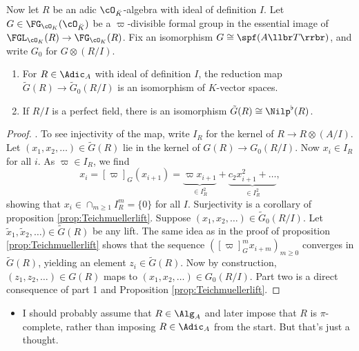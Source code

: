 \documentclass[../main.tex]{subfiles}
\begin{document}
\begin{prop}\label{prop:UnivCovRep}
    Now let $R$ be an adic $\cO_{\breve K}$-algebra with
    ideal of definition $I$. Let $G \in \FG_{\cO_K}(\cO_{\breve K})$ be a 
    $\varpi$-divisible formal group in the essential image of 
    $\FGL_{\cO_K}(R) \to \FG_{\cO_K}(R)$. Fix an isomorphism $G \cong
    \spf(A\llbr T \rrbr)$, and write $G_0$ for $G \otimes (R/I)$. 
    \begin{enumerate}
        \item For $R \in \Adic_A$ with ideal of definition $I$, the reduction
            map $\tilde G(R) \to \tilde G_0(R/I)$ is an isomorphism of 
            $K$-vector spaces.
        \item If $R/I$ is a perfect field, there is an isomorphism $\tilde G(R)
            \cong \Nilp^\flat(R)$.
    \end{enumerate}
\begin{proof}
    .
    To see injectivity of the map, write $I_R$ for the kernel of $R \to R \otimes
    (A/I)$. Let $(x_1, x_2, \dots) \in \tilde G(R)$ lie in the kernel of $G(R)
    \to G_0(R/I)$. Now $x_i \in I_R$ for all $i$. As $\varpi \in I_R$, we find 
    $$x_{i} = [\varpi]_G(x_{i+1}) = \underbrace{\varpi x_{i+1}}_{\in I_R^2} +
    \underbrace{c_2 x_{i+1}^2 + \dots}_{\in I_R^2},$$
    showing that $x_i \in \cap_{m\geq 1} I_R^m = \{0\}$ for all $I$.
    Surjectivity is a corollary of proposition \ref{prop:Teichmuellerlift}. 
    Suppose $(x_1, x_2, \dots) \in \tilde G_0(R/I)$. Let
    $\tilde x_1, \tilde x_2, \dots) \in \tilde G(R)$ be any lift. The same idea
    as in the proof of proposition \ref{prop:Teichmuellerlift} shows that the
    sequence $([\varpi]_G^{m} x_{i+m})_{m\geq 0}$ converges in $\tilde G(R)$, yielding 
    an element $z_i \in \tilde G(R)$. Now by construction, $(z_1, z_2, \dots) \in 
    G(R)$ maps to $(x_1, x_2, \dots)\in G_0(R/I)$. 
    Part two is a direct consequence of part 1 and Proposition
    \ref{prop:Teichmuellerlift}.
\end{proof}
\end{prop}

\color{darkgray}
\begin{itemize}
    \item I should probably assume that $R \in \Alg_A$ and later impose that $R$ is 
        $\pi$-complete, rather than imposing $R \in \Adic_A$ from the start. But 
        that's just a thought.
\end{itemize}
\end{document}
